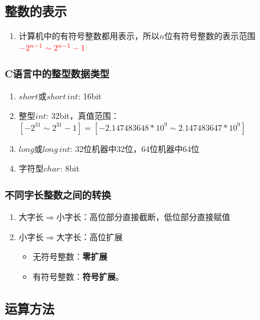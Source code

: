 \documentclass[a4paper,12pt]{article}
\begin{document}
    \subsection{整数的表示}

    \begin{enumerate}
        \item 计算机中的有符号整数都用{\color{red}{补码}}表示，所以$n$位有符号整数的表示范围${\color{red}{-2^{n-1} \sim 2^{n-1} - 1}}$
    \end{enumerate}

    \subsubsection{C语言中的整型数据类型}

    \begin{enumerate}
        \item $short$或$short \, int$: 16bit
        \item 整型$int$: 32bit，真值范围：$[-2^{31} \sim 2^{31}-1] = [-2.147483648*10^{9} \sim 2.147483647 * 10^{9}]$
        \item $long$或$long \,int$: 32位机器中32位，64位机器中64位
        \item 字符型$char$: 8bit
    \end{enumerate}

    \subsubsection{不同字长整数之间的转换}

    \begin{enumerate}
        \item 大字长$\Rightarrow$小字长：高位部分直接截断，低位部分直接赋值
        \item 小字长$\Rightarrow$大字长：高位扩展
        \begin{itemize}
            \item 无符号整数：\textbf{零扩展}
            \item 有符号整数：\textbf{符号扩展}。{\color{red}{符号扩展前后真值保持不变}}
        \end{itemize}
    \end{enumerate}

    \subsection{运算方法}
\end{document}
